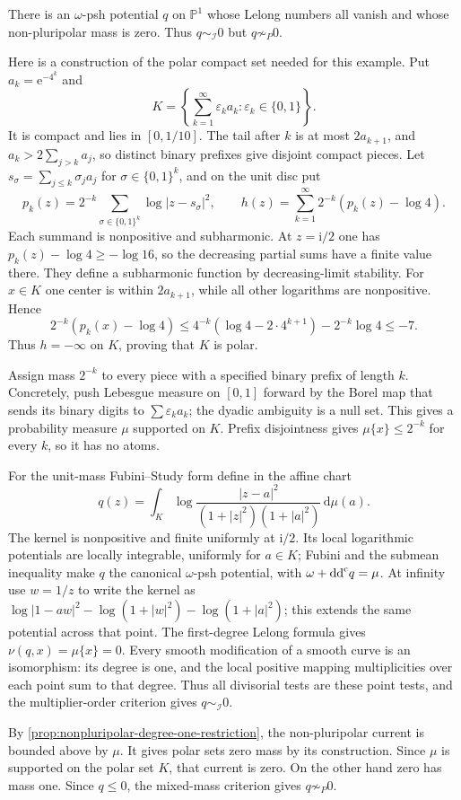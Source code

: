 \begin{example}\label{ex:multiplier-and-model-types-differ}
There is an $\omega$-psh potential $q$ on $\mathbb P^1$ whose Lelong numbers all vanish and whose non-pluripolar mass is zero. Thus $q\sim_{\mathcal I}0$ but $q\not\sim_P0$.

Here is a construction of the polar compact set needed for this example. Put $a_k=\mathrm e^{-4^k}$ and
\[
 K=\left\{\sum_{k=1}^\infty\varepsilon_k a_k:
                                      \varepsilon_k\in\{0,1\}\right\}.
\]
It is compact and lies in $[0,1/10]$. The tail after $k$ is at most $2a_{k+1}$, and $a_k>2\sum_{j>k}a_j$, so distinct binary prefixes give disjoint compact pieces. Let $s_\sigma=\sum_{j\leq k}\sigma_j a_j$ for $\sigma\in\{0,1\}^k$, and on the unit disc put
\[
 p_k(z)=2^{-k}\sum_{\sigma\in\{0,1\}^k}\log|z-s_\sigma|^2,
 \qquad h(z)=\sum_{k=1}^\infty2^{-k}(p_k(z)-\log4).
\]
Each summand is nonpositive and subharmonic. At $z=\mathrm i/2$ one has $p_k(z)-\log4\geq-\log16$, so the decreasing partial sums have a finite value there. They define a subharmonic function by decreasing-limit stability. For $x\in K$ one center is within $2a_{k+1}$, while all other logarithms are nonpositive. Hence
\[
 2^{-k}(p_k(x)-\log4)
      \leq4^{-k}(\log4-2\cdot4^{k+1})-2^{-k}\log4\leq-7.
\]
Thus $h=-\infty$ on $K$, proving that $K$ is polar.

Assign mass $2^{-k}$ to every piece with a specified binary prefix of length $k$. Concretely, push Lebesgue measure on $[0,1]$ forward by the Borel map that sends its binary digits to $\sum\varepsilon_k a_k$; the dyadic ambiguity is a null set. This gives a probability measure $\mu$ supported on $K$. Prefix disjointness gives $\mu\{x\}\leq2^{-k}$ for every $k$, so it has no atoms.

For the unit-mass Fubini--Study form define in the affine chart
\[
 q(z)=\int_K\log\frac{|z-a|^2}{(1+|z|^2)(1+|a|^2)}\,\mathrm d\mu(a).
\]
The kernel is nonpositive and finite uniformly at $\mathrm i/2$. Its local logarithmic potentials are locally integrable, uniformly for $a\in K$; Fubini and the submean inequality make $q$ the canonical $\omega$-psh potential, with $\omega+\mathrm{dd}^{\mathrm{c}} q=\mu$. At infinity use $w=1/z$ to write the kernel as $\log|1-aw|^2-\log(1+|w|^2)-\log(1+|a|^2)$; this extends the same potential across that point. The first-degree Lelong formula gives $\nu(q,x)=\mu\{x\}=0$. Every smooth modification of a smooth curve is an isomorphism: its degree is one, and the local positive mapping multiplicities over each point sum to that degree. Thus all divisorial tests are these point tests, and the multiplier-order criterion gives $q\sim_{\mathcal I}0$.

By \cref{prop:nonpluripolar-degree-one-restriction}, the non-pluripolar current is bounded above by $\mu$. It gives polar sets zero mass by its construction. Since $\mu$ is supported on the polar set $K$, that current is zero. On the other hand zero has mass one. Since $q\leq0$, the mixed-mass criterion gives $q\not\sim_P0$.
\end{example}

